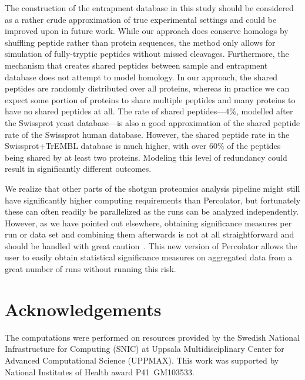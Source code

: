 \documentclass{article}
\begin{document}
The construction of the entrapment database in this study should be
considered as a rather crude approximation of true experimental
settings and could be improved upon in future work. While our approach
does conserve homologs by shuffling peptide rather than protein
sequences, the method only allows for simulation of fully-tryptic
peptides without missed cleavages.  Furthermore, the mechanism that
creates shared peptides between sample and entrapment database does
not attempt to model homology.  In our approach, the shared peptides
are randomly distributed over all proteins, whereas in practice we can
expect some portion of proteins to share multiple peptides and many
proteins to have no shared peptides at all. The rate of shared
peptides---$4\%$, modelled after the Swissprot yeast database---is
also a good approximation of the shared peptide rate of the Swissprot
human database. However, the shared peptide rate in the
Swissprot+TrEMBL database is much higher, with over $60\%$ of the
peptides being shared by at least two proteins.  Modeling this level
of redundancy could result in significantly different outcomes.

We realize that other parts of the shotgun proteomics analysis
pipeline might still have significantly higher computing requirements
than Percolator, but fortunately these can often readily be
parallelized as the runs can be analyzed independently. However, as we
have pointed out elsewhere, obtaining significance measures per run or
data set and combining them afterwards is not at all straightforward
and should be handled with great caution~\cite{serang2015solution}.
This new version of Percolator allows the user to easily obtain
statistical significance measures on aggregated data from a great
number of runs without running this risk.

\section*{Acknowledgements}

The computations were performed on resources provided by the Swedish
National Infrastructure for Computing (SNIC) at Uppsala
Multidisciplinary Center for Advanced Computational Science
(UPPMAX). This work was supported by National Institutes of Health
award P41~GM103533.



\end{document}

